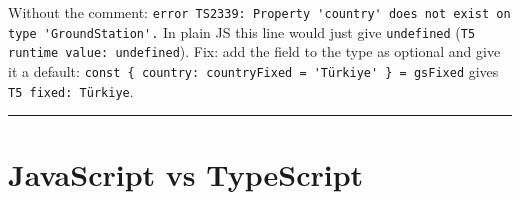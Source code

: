 Without the comment: \passthrough{\lstinline!error TS2339: Property 'country' does not exist on type 'GroundStation'.!} In plain JS this line would just give \passthrough{\lstinline!undefined!} (\passthrough{\lstinline!T5 runtime value: undefined!}). Fix: add the field to the type as optional and give it a default: \passthrough{\lstinline!const \{ country: countryFixed = 'Türkiye' \} = gsFixed!} gives \passthrough{\lstinline!T5 fixed: Türkiye!}.

\begin{center}\rule{0.5\linewidth}{0.5pt}\end{center}

\hypertarget{javascript-vs-typescript}{%
\section{JavaScript vs TypeScript}\label{javascript-vs-typescript}}


